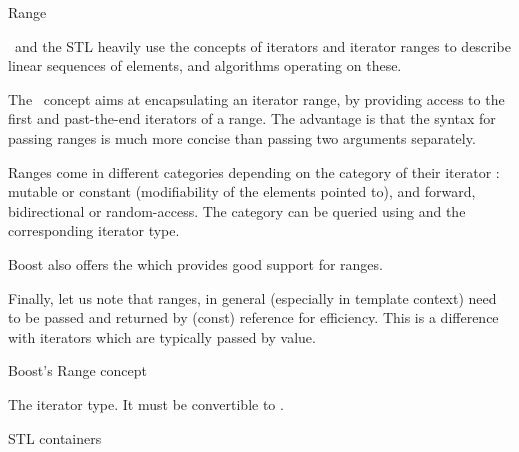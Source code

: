 \begin{ccRefConcept}{Range}

\ccDefinition

\cgal\ and the STL heavily use the concepts of iterators and iterator ranges
to describe linear sequences of elements, and algorithms operating on these.

The \ccRefName\ concept aims at encapsulating an iterator range, by providing
access to the first and past-the-end iterators of a range.  The advantage is
that the syntax for passing ranges is much more concise than passing two
arguments separately.


Ranges come in different categories depending on the category of their iterator :
mutable or constant (modifiability of the elements pointed to), and forward,
bidirectional or random-access.  The category can be queried using
 and the corresponding iterator type.

Boost also offers the
which provides good support for ranges.

Finally, let us note that ranges, in general (especially in template context)
need to be passed and returned by (const) reference for efficiency.  This is a
difference with iterators which are typically passed by value.

\ccRefines


Boost's Range concept

{}  %

\ccTypes

 {The iterator type.  It must be convertible to .}


\def\ccTagRmTrailingConst{\ccFalse}

\ccGlue
{}

\def\ccTagRmTrailingConst{\ccTrue}

\ccHasModels
STL containers\\
%
{}

\end{ccRefConcept}
